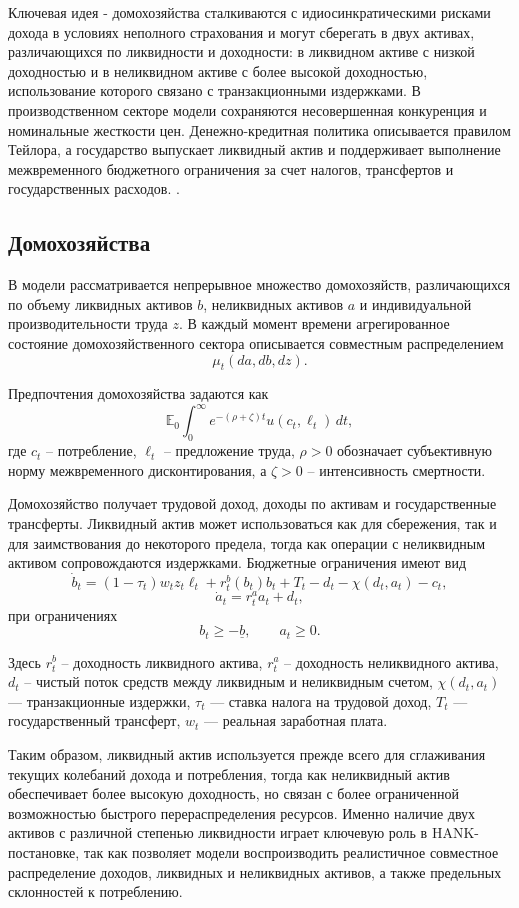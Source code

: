 \documentclass[12pt,a4paper]{article}
\begin{document}
Ключевая идея - домохозяйства сталкиваются с идиосинкратическими рисками дохода в условиях неполного страхования и могут сберегать в двух активах, различающихся по ликвидности и доходности: в ликвидном активе с низкой доходностью и в неликвидном активе с более высокой доходностью, использование которого связано с транзакционными издержками. В производственном секторе модели сохраняются несовершенная конкуренция и номинальные жесткости цен. Денежно-кредитная политика описывается правилом Тейлора, а государство выпускает ликвидный актив и поддерживает выполнение межвременного бюджетного ограничения за счет налогов, трансфертов и государственных расходов.
\cite{KaplanMollViolante2018}.

\subsection{Домохозяйства}

В модели рассматривается непрерывное множество домохозяйств, различающихся по объему ликвидных активов $b$, неликвидных активов $a$ и индивидуальной производительности труда $z$. В каждый момент времени агрегированное состояние домохозяйственного сектора описывается совместным распределением
\[
\mu_t(da,db,dz).
\]

Предпочтения домохозяйства задаются как
\[
\mathbb{E}_0 \int_0^\infty e^{-(\rho+\zeta)t} u(c_t,\ell_t)\,dt,
\]
где $c_t$ -- потребление, $\ell_t$ -- предложение труда, $\rho>0$ обозначает субъективную норму межвременного дисконтирования, а $\zeta>0$ -- интенсивность смертности.

Домохозяйство получает трудовой доход, доходы по активам и государственные трансферты. Ликвидный актив может использоваться как для сбережения, так и для заимствования до некоторого предела, тогда как операции с неликвидным активом сопровождаются издержками. Бюджетные ограничения имеют вид
\[
\dot b_t = (1-\tau_t) w_t z_t \ell_t + r_t^b(b_t)b_t + T_t - d_t - \chi(d_t,a_t) - c_t,
\]
\[
\dot a_t = r_t^a a_t + d_t,
\]
при ограничениях
\[
b_t \geq -\underline b, 
\qquad
a_t \geq 0.
\]

Здесь $r_t^b$ -- доходность ликвидного актива, $r_t^a$ -- доходность неликвидного актива, $d_t$ -- чистый поток средств между ликвидным и неликвидным счетом, $\chi(d_t,a_t)$ --- транзакционные издержки, $\tau_t$ --- ставка налога на трудовой доход, $T_t$ --- государственный трансферт, $w_t$ --- реальная заработная плата.

Таким образом, ликвидный актив используется прежде всего для сглаживания текущих колебаний дохода и потребления, тогда как неликвидный актив обеспечивает более высокую доходность, но связан с более ограниченной возможностью быстрого перераспределения ресурсов. Именно наличие двух активов с различной степенью ликвидности играет ключевую роль в HANK-постановке, так как позволяет модели воспроизводить реалистичное совместное распределение доходов, ликвидных и неликвидных активов, а также предельных склонностей к потреблению.
\end{document}
